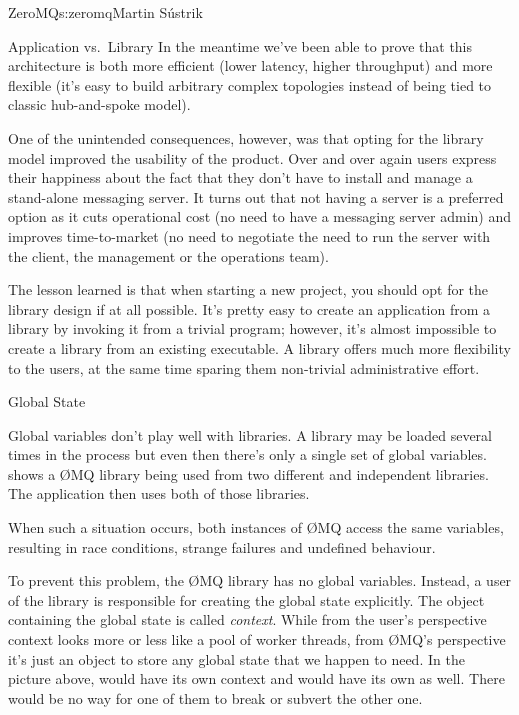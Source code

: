 \begin{aosachapter}{ZeroMQ}{s:zeromq}{Martin S\'{u}strik}
\begin{aosasect1}{Application vs.\ Library}
In the meantime we've been able to prove that this architecture is
both more efficient (lower latency, higher throughput) and more
flexible (it's easy to build arbitrary complex topologies instead of
being tied to classic hub-and-spoke model).


One of the unintended consequences, however, was that opting for the
library model improved the usability of the product. Over and over
again users express their happiness about the fact that they don't
have to install and manage a stand-alone messaging server. It turns
out that not having a server is a preferred option as it cuts
operational cost (no need to have a messaging server admin) and
improves time-to-market (no need to negotiate the need to run the
server with the client, the management or the operations team).

The lesson learned is that when starting a new project, you should opt
for the library design if at all possible. It's pretty easy to create
an application from a library by invoking it from a trivial program;
however, it's almost impossible to create a library from an existing
executable. A library offers much more flexibility to the users, at the
same time sparing them non-trivial administrative effort.

\end{aosasect1}

\begin{aosasect1}{Global State}

Global variables don't play well with libraries. A library may be loaded
several times in the process but even then there's
only a single set of global
variables.  shows a {\O}MQ library being
used from two different and independent libraries. The application
then uses both of those libraries.

When such a situation occurs, both instances of {\O}MQ access the same
variables, resulting in race conditions, strange failures and undefined
behaviour.

To prevent this problem, the {\O}MQ library has no global variables. Instead,
a user of the library is responsible for creating the global state
explicitly. The object containing the global state is called
\emph{context}. While from the user's perspective context looks more or
less like a pool of worker threads, from {\O}MQ's perspective it's just
an object to store any global state that we happen to need. 
In the picture above,  would have its own context and 
would have its own as well. There would be no way for one of them to
break or subvert the other one.


\end{aosasect1}
\end{aosachapter}
